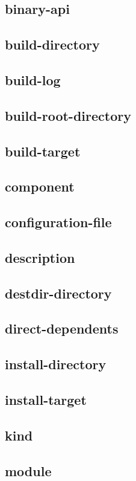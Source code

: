 \subsection{binary-api}
\subsection{build-directory}
\subsection{build-log}
\subsection{build-root-directory}
\subsection{build-target}
\subsection{component}
\subsection{configuration-file}
\subsection{description}
\subsection{destdir-directory}
\subsection{direct-dependents}
\subsection{install-directory}
\subsection{install-target}
\subsection{kind}
\subsection{module}
